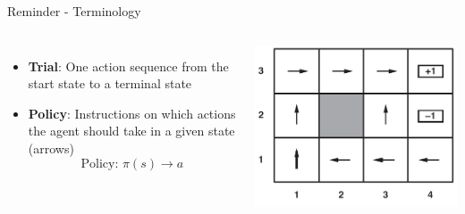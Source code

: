 \begin{frame}[c]{Reminder - Terminology}
\begin{columns}[c]
	\begin{itemize}
		\item \textbf{Trial}: One action sequence from the start state to a terminal state
		\item \textbf{Policy}: Instructions on which actions the agent should take in a given state (arrows)
		\begin{equation*}
			\text{Policy: }\pi(s) \rightarrow a
		\end{equation*}
	\end{itemize}
	\begin{center}
		\includegraphics[width=0.9\linewidth]{img-elias/optimal_policy.png}
	\end{center}
\end{columns}
\end{frame}

